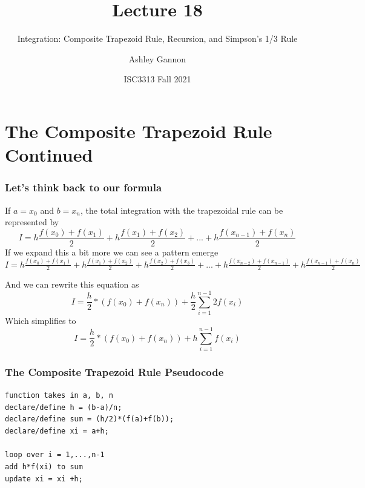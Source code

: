 \documentclass{if-beamer}
\title[Lecture 18]{Lecture 18}
\subtitle{Integration: Composite Trapezoid Rule, Recursion, and Simpson's 1/3 Rule}
\author{Ashley Gannon}
\date{ISC3313 Fall 2021}
\begin{document}
\begin{frame}
  \titlepage
\end{frame}
\section{The Composite Trapezoid Rule Continued}

\begin{frame}
\frametitle{Let's think back to our formula}
If $a = x_0$ and $b=x_n$, the total integration with the trapezoidal rule can be represented by
$$I = h\frac{f(x_0)+f(x_1)}{2}+h\frac{f(x_1)+f(x_2)}{2}+...+h\frac{f(x_{n-1})+f(x_n)}{2}$$
If we expand this a bit more we can see a pattern emerge\\\vspace{5pt}
$I = h\frac{f(x_0)+f(x_1)}{2}+h\frac{f(x_1)+f(x_2)}{2}+h\frac{f(x_2)+f(x_3)}{2}+...+h\frac{f(x_{n-2})+f(x_{n-1})}{2}+h\frac{f(x_{n-1})+f(x_n)}{2}$\\\vspace{5pt}

And we can rewrite this equation as 
$$ I = \frac{h}{2}*(f(x_0)+f(x_n))+\frac{h}{2}\sum_{i=1}^{n-1}2f(x_i)$$ 
Which simplifies to
$$ I = \frac{h}{2}*(f(x_0)+f(x_n))+h\sum_{i=1}^{n-1}f(x_i)$$ 

\end{frame}

\begin{frame}
	\frametitle{The Composite Trapezoid Rule Pseudocode}
	
	\texttt{function takes in a, b, n}\\
	\texttt{declare/define h = (b-a)/n;}\\
	\texttt{declare/define sum = (h/2)*(f(a)+f(b)); }\\
	\texttt{declare/define xi = a+h;}\\
	\texttt{ }\\
	\texttt{loop over i = 1,...,n-1 }\\
	\texttt{\qquad add h*f(xi) to sum} \\
	\texttt{\qquad update xi = xi +h;}\\
	
\end{frame}	
\end{document}
